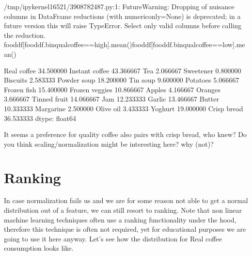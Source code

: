 \documentclass[letterpaper,10pt,english]{jupyterBook}
\begin{document}
\begin{sphinxVerbatim}[commandchars=\\\{\}]
/tmp/ipykernel\PYGZus{}16521/3908782487.py:1: FutureWarning: Dropping of nuisance columns in DataFrame reductions (with \PYGZsq{}numeric\PYGZus{}only=None\PYGZsq{}) is deprecated; in a future version this will raise TypeError.  Select only valid columns before calling the reduction.
  food\PYGZus{}df[food\PYGZus{}df.bin\PYGZus{}qual\PYGZus{}coffee==\PYGZsq{}high\PYGZsq{}].mean()\PYGZhy{}food\PYGZus{}df[food\PYGZus{}df.bin\PYGZus{}qual\PYGZus{}coffee==\PYGZsq{}low\PYGZsq{}].mean()
\end{sphinxVerbatim}

\begin{sphinxVerbatim}[commandchars=\\\{\}]
Real coffee       34.500000
Instant coffee   \PYGZhy{}43.366667
Tea                2.066667
Sweetener         \PYGZhy{}0.800000
Biscuits           2.583333
Powder soup      \PYGZhy{}18.200000
Tin soup          \PYGZhy{}9.600000
Potatoes           5.066667
Frozen fish       15.400000
Frozen veggies    10.866667
Apples            \PYGZhy{}4.166667
Oranges            3.666667
Tinned fruit     \PYGZhy{}14.066667
Jam              \PYGZhy{}12.233333
Garlic           \PYGZhy{}13.466667
Butter            10.333333
Margarine          2.500000
Olive oil         \PYGZhy{}3.433333
Yoghurt          \PYGZhy{}19.000000
Crisp bread       36.533333
dtype: float64
\end{sphinxVerbatim}

\sphinxAtStartPar
It seems a preference for quality coffee also pairs with crisp bread, who knew?
Do you think scaling/normalization might be interesting here? why (not)?


\section{Ranking}
\label{\detokenize{c2_data_preparation/binning_ranking:ranking}}
\sphinxAtStartPar
In case normalization fails us and we are for some reason not able to get a normal distribution out of a feature, we can still resort to ranking.
Note that non linear machine learning techniques often use a ranking functionality under the hood, therefore this technique is often not required, yet for educational purposes we are going to use it here anyway.
Let’s see how the distribution for Real coffee consumption looks like.

\begin{sphinxVerbatim}[commandchars=\\\{\}]
\end{sphinxVerbatim}
\end{document}
